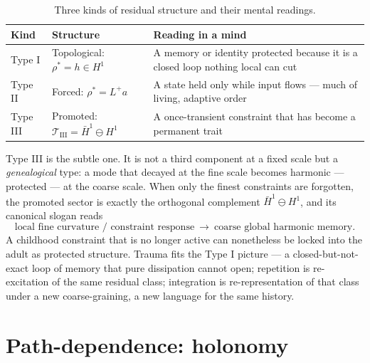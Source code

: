 \documentclass[11pt,a4paper]{article}
\theoremstyle{plain}
\begin{document}
\begin{table}[htbp]
\centering\small
\begin{tabularx}{\textwidth}{@{}l Y Y@{}}
\toprule
Kind & Structure & Reading in a mind \\
\midrule
Type I & Topological: $\rho^\ast=h\in H^1$ & A memory or identity protected because it is a closed loop nothing local can cut \\
Type II & Forced: $\rho^\ast=L^{+}a$ & A state held only while input flows --- much of living, adaptive order \\
Type III & Promoted: $\mathcal T_{\mathrm{III}}=\bar H^1\ominus H^1$ & A once-transient constraint that has become a permanent trait \\
\bottomrule
\end{tabularx}
\caption{Three kinds of residual structure and their mental readings.}
\label{tab:types}
\end{table}

Type III is the subtle one. It is not a third component at a fixed scale but a \emph{genealogical} type:
a mode that decayed at the fine scale becomes harmonic --- protected --- at the coarse scale. When only
the finest constraints are forgotten, the promoted sector is exactly the orthogonal complement
$\bar H^1\ominus H^1$, and its canonical slogan reads
\begin{equation}
\boxed{\ \text{local fine curvature / constraint response}\ \longrightarrow\ \text{coarse global harmonic memory}.\ }
\end{equation}
A childhood constraint that is no longer active can nonetheless be locked into the adult as protected
structure. Trauma fits the Type I picture --- a closed-but-not-exact loop of memory that pure dissipation
cannot open; repetition is re-excitation of the same residual class; integration is re-representation of
that class under a new coarse-graining, a new language for the same history.

\section{Path-dependence: holonomy}\label{sec:holonomy}
\end{document}
